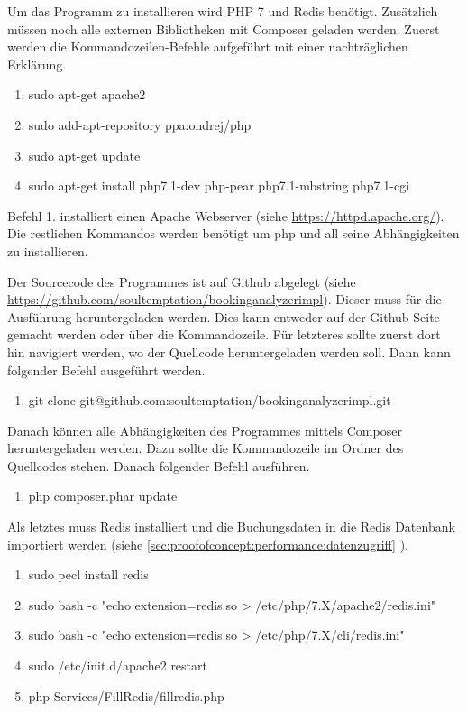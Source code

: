 Um das Programm zu installieren wird PHP 7 und Redis benötigt. Zusätzlich müssen noch alle externen Bibliotheken mit Composer geladen werden. Zuerst werden die Kommandozeilen-Befehle aufgeführt mit einer nachträglichen Erklärung. 

\begin{enumerate}
\item sudo apt-get apache2
\item sudo add-apt-repository ppa:ondrej/php
\item sudo apt-get update
\item sudo apt-get install php7.1-dev php-pear php7.1-mbstring php7.1-cgi
\end{enumerate}
Befehl 1. installiert einen Apache Webserver (siehe \url{https://httpd.apache.org/}). Die restlichen Kommandos werden benötigt um \gls{php} und all seine Abhängigkeiten zu installieren. 

Der Sourcecode des Programmes ist auf Github abgelegt (siehe \url{https://github.com/soultemptation/bookinganalyzerimpl}). Dieser muss für die Ausführung heruntergeladen werden. Dies kann entweder auf der Github Seite gemacht werden oder über die Kommandozeile. Für letzteres sollte zuerst dort hin navigiert werden, wo der Quellcode heruntergeladen werden soll. Dann kann folgender Befehl ausgeführt werden.
\begin{enumerate}[resume]
\item git clone git@github.com:soultemptation/bookinganalyzerimpl.git
\end{enumerate}

Danach können alle Abhängigkeiten des Programmes mittels Composer heruntergeladen werden. Dazu sollte die Kommandozeile im Ordner des Quellcodes stehen. Danach folgender Befehl ausführen.
\begin{enumerate}[resume]
\item php composer.phar update
\end{enumerate}

Als letztes muss Redis installiert und die Buchungsdaten in die Redis Datenbank importiert werden (siehe \cref{sec:proofofconcept:performance:datenzugriff} ).

\begin{enumerate}[resume]
\item sudo pecl install redis
\item sudo bash -c "echo extension=redis.so > /etc/php/7.X/apache2/redis.ini"
\item sudo bash -c "echo extension=redis.so > /etc/php/7.X/cli/redis.ini"
\item sudo /etc/init.d/apache2 restart
\item php Services/FillRedis/fillredis.php
\end{enumerate}

